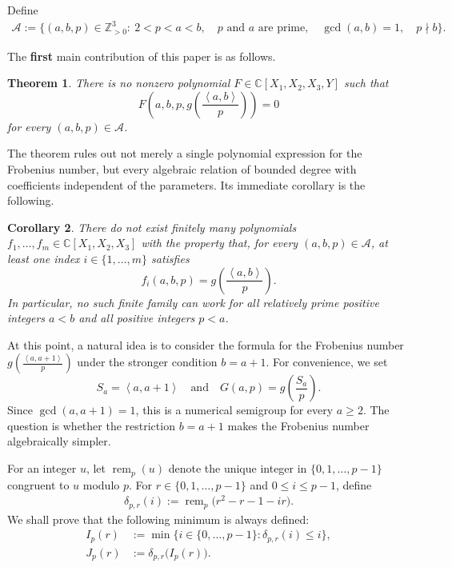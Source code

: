 \documentclass[reqno, 12pt]{article}
\numberwithin{equation}{section}
\newtheorem{theorem}{Theorem}[section]
\newtheorem{corollary}[theorem]{Corollary}
\theoremstyle{definition}
\newcommand{\ZZ}{\mathbb{Z}}
\newcommand{\CC}{\mathbb{C}}
\newcommand{\cA}{\mathcal{A}}
\newcommand{\gen}[1]{\left\langle #1\right\rangle}
\newcommand{\remp}{\operatorname{rem}}
\begin{document}
Define
\begin{align*}
  \cA:=\bigl\{(a,b,p)\in\ZZ_{>0}^{3}: \ 2<p<a<b,\quad p\text{ and }a\text{ are prime},\quad  \gcd(a,b)=1,\quad p\nmid b\bigr\}.
\end{align*}

The \textbf{first} main contribution of this paper is as follows.
\begin{theorem}\label{thm:main}
There is no nonzero polynomial $F\in\CC[X_1,X_2,X_3,Y]$ such that
\begin{equation}\label{eq:main-relation}
  F\left(a,b,p,
  g\!\left(\frac{\gen{a,b}}{p}\right)\right)=0
\end{equation}
for every $(a,b,p)\in\cA$.
\end{theorem}

The theorem rules out not merely a single polynomial expression for the Frobenius number, but every algebraic relation of bounded degree with coefficients independent of the parameters.  Its immediate corollary is the following.

\begin{corollary}\label{cor:finite-poly-intro}
There do not exist finitely many polynomials $f_1,\ldots,f_m\in\CC[X_1,X_2,X_3]$ with the property that, for every $(a,b,p)\in\cA$, at least one index $i\in\{1,\ldots,m\}$ satisfies
\[f_i(a,b,p)=g\!\left(\frac{\gen{a,b}}{p}\right).
\]
In particular, no such finite family can work for all relatively prime positive integers $a<b$ and all positive integers $p<a$.
\end{corollary}

At this point, a natural idea is to consider the formula for the Frobenius number $g\!\left(\frac{\gen{a,a+1}}{p}\right)$ under the stronger condition $b=a+1$.
For convenience, we set 
$$S_a=\gen{a,a+1}\quad \text{and} \quad G(a,p)=g\left(\frac{S_a}{p}\right).$$
Since $\gcd(a,a+1)=1$, this is a numerical semigroup for every $a\ge2$.
The question is whether the restriction $b=a+1$ makes the Frobenius number algebraically simpler.


For an integer $u$, let $\remp_p(u)$ denote the unique integer in
$\{0,1,\ldots,p-1\}$ congruent to $u$ modulo $p$.  For
$r\in\{0,1,\ldots,p-1\}$ and $0\le i\le p-1$, define
\begin{align*}
\delta_{p,r}(i) :=\remp_p\bigl(r^2-r-1-ir\bigr).
\end{align*}
We shall prove that the following minimum is always defined:
\begin{align*}
   I_p(r)&:=\min\{i\in\{0,\ldots,p-1\}:\delta_{p,r}(i)\le i\},\\
   J_p(r)&:=\delta_{p,r}\bigl(I_p(r)\bigr).
\end{align*}
\end{document}
